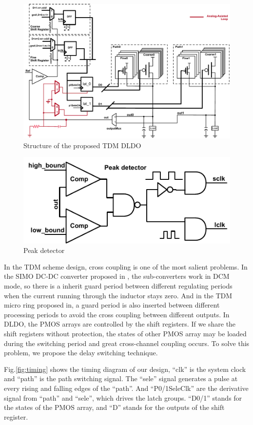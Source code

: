 \documentclass[journal]{IEEEtran}
\begin{document}
\begin{figure}[t!]
    \centering
    \includegraphics{pic/struc/sche.pdf}
    \caption{Structure of the proposed TDM DLDO}
    \label{fig:diag}
\end{figure}
\begin{figure}[t!]
    \centering
    \includegraphics[width=0.7\linewidth]{pic/struc/peak.pdf}
    \caption{Peak detector}
    \label{fig:peak}
\end{figure}
In the TDM scheme design, cross coupling is one of the most salient problems. In the SIMO DC-DC converter proposed in \cite{SIMODCDC}, the sub-converters work in DCM mode, so there is a inherit guard period  between different regulating periods when the current running through the inductor stays zero. And in the TDM micro ring proposed in\cite{wangzhicheng}, a guard period is also inserted between different processing periods to avoid the cross coupling between different outputs. In DLDO, the PMOS arrays are controlled by the shift registers. If we share the shift registers without protection, the states of other PMOS array may be loaded during the switching period and great cross-channel coupling occurs. To solve this problem, we propose the delay switching technique.

Fig.\ref{fig:timing} shows the timing diagram of our design, ``clk'' is the system clock and ``path'' is the path switching signal. The ``sele'' signal generates a pulse at every rising and falling edges of the ``path''. And ``P0/1SeleClk'' are the derivative signal from ``path'' and ``sele'', which drives the latch groups. “D0/1” stands for the states of the PMOS array, and “D” stands for the outputs of the shift register. 
\end{document}
